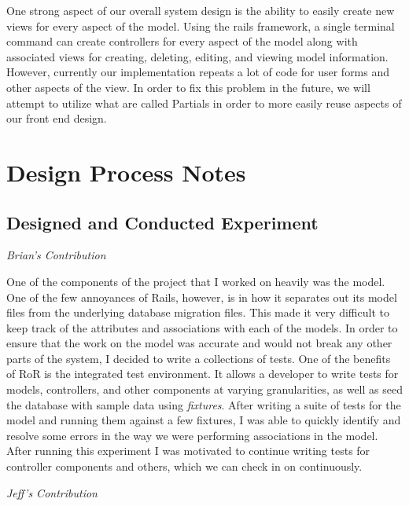 \documentclass[11pt]{article}
\begin{document}
One strong aspect of our overall system design is the ability to easily create new views for every aspect of the model.  Using the rails framework, a single terminal command can create controllers for every aspect of the model along with associated views for creating, deleting, editing, and viewing model information.  However, currently our implementation repeats a lot of code for user forms and other aspects of the view.  In order to fix this problem in the future, we will attempt to utilize what are called Partials in order to more easily reuse aspects of our front end design.

\section{Design Process Notes}

\subsection{Designed and Conducted Experiment}

\textit{Brian's Contribution}

One of the components of the project that I worked on heavily was the model. One of the few annoyances of Rails, however, is in how it separates out its model files from the underlying database migration files. This made it very difficult to keep track of the attributes and associations with each of the models. In order to ensure that the work on the model was accurate and would not break any other parts of the system, I decided to write a collections of tests. One of the benefits of RoR is the integrated test environment. It allows a developer to write tests for models, controllers, and other components at varying granularities, as well as seed the database with sample data using \textit{fixtures}. After writing a suite of tests for the model and running them against a few fixtures, I was able to quickly identify and resolve some errors in the way we were performing associations in the model. After running this experiment I was motivated to continue writing tests for controller components and others, which we can check in on continuously. 

\textit{Jeff's Contribution}
\end{document}
